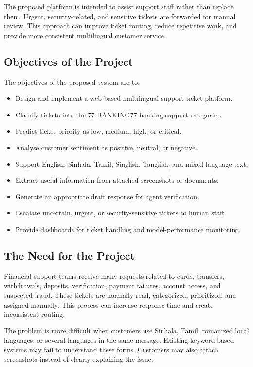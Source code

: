 \documentclass[11pt,a4paper]{article}
\begin{document}
The proposed platform is intended to assist support staff rather than replace them. Urgent, security-related, and sensitive tickets are forwarded for manual review. This approach can improve ticket routing, reduce repetitive work, and provide more consistent multilingual customer service.

\subsection{Objectives of the Project}

The objectives of the proposed system are to:

\begin{itemize}
    \item Design and implement a web-based multilingual support ticket platform.
    \item Classify tickets into the 77 BANKING77 banking-support categories.
    \item Predict ticket priority as low, medium, high, or critical.
    \item Analyse customer sentiment as positive, neutral, or negative.
    \item Support English, Sinhala, Tamil, Singlish, Tanglish, and mixed-language text.
    \item Extract useful information from attached screenshots or documents.
    \item Generate an appropriate draft response for agent verification.
    \item Escalate uncertain, urgent, or security-sensitive tickets to human staff.
    \item Provide dashboards for ticket handling and model-performance monitoring.
\end{itemize}

\subsection{The Need for the Project}

Financial support teams receive many requests related to cards, transfers, withdrawals, deposits, verification, payment failures, account access, and suspected fraud. These tickets are normally read, categorized, prioritized, and assigned manually. This process can increase response time and create inconsistent routing.

The problem is more difficult when customers use Sinhala, Tamil, romanized local languages, or several languages in the same message. Existing keyword-based systems may fail to understand these forms. Customers may also attach screenshots instead of clearly explaining the issue.
\end{document}
